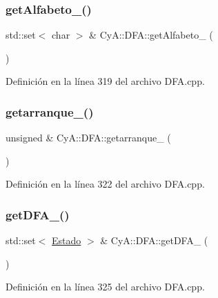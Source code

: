 \subsubsection{\texorpdfstring{get\+Alfabeto\+\_\+()}{getAlfabeto\_()}}
{\footnotesize\ttfamily std\+::set$<$ char $>$ \& Cy\+A\+::\+D\+F\+A\+::get\+Alfabeto\+\_\+ (\begin{DoxyParamCaption}{ }\end{DoxyParamCaption})}



Definición en la línea 319 del archivo D\+F\+A.\+cpp.

\mbox{\label{class_cy_a_1_1_d_f_a_ac83c5a6a78fcbf634936888ca53051bf}} 
\subsubsection{\texorpdfstring{getarranque\+\_\+()}{getarranque\_()}}
{\footnotesize\ttfamily unsigned \& Cy\+A\+::\+D\+F\+A\+::getarranque\+\_\+ (\begin{DoxyParamCaption}{ }\end{DoxyParamCaption})}



Definición en la línea 322 del archivo D\+F\+A.\+cpp.

\mbox{\label{class_cy_a_1_1_d_f_a_ae839d9e4d46f389481eb493d6d399668}} 
\subsubsection{\texorpdfstring{get\+D\+F\+A\+\_\+()}{getDFA\_()}}
{\footnotesize\ttfamily std\+::set$<$ \mbox{\hyperlink{class_cy_a_1_1_estado}{Estado}} $>$ \& Cy\+A\+::\+D\+F\+A\+::get\+D\+F\+A\+\_\+ (\begin{DoxyParamCaption}{ }\end{DoxyParamCaption})}



Definición en la línea 325 del archivo D\+F\+A.\+cpp.

\mbox{\label{class_cy_a_1_1_d_f_a_ae5b9198e9e2676f25d1c1ff60172a494}} 
